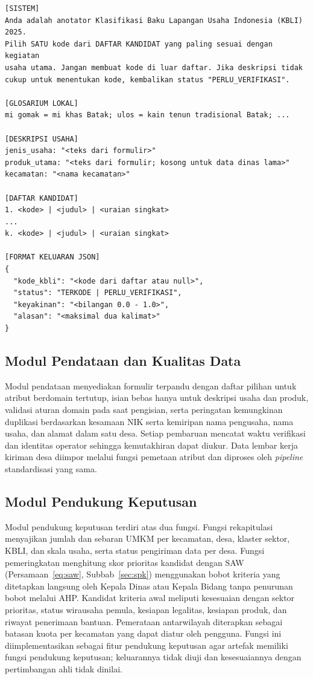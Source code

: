 \begin{lstlisting}[language={}, caption={Rancangan Struktur \textit{Prompt} dan Keluaran Standardisasi KBLI}, label={lst:prompt}]
[SISTEM]
Anda adalah anotator Klasifikasi Baku Lapangan Usaha Indonesia (KBLI) 2025.
Pilih SATU kode dari DAFTAR KANDIDAT yang paling sesuai dengan kegiatan
usaha utama. Jangan membuat kode di luar daftar. Jika deskripsi tidak
cukup untuk menentukan kode, kembalikan status "PERLU_VERIFIKASI".

[GLOSARIUM LOKAL]
mi gomak = mi khas Batak; ulos = kain tenun tradisional Batak; ...

[DESKRIPSI USAHA]
jenis_usaha: "<teks dari formulir>"
produk_utama: "<teks dari formulir; kosong untuk data dinas lama>"
kecamatan: "<nama kecamatan>"

[DAFTAR KANDIDAT]
1. <kode> | <judul> | <uraian singkat>
...
k. <kode> | <judul> | <uraian singkat>

[FORMAT KELUARAN JSON]
{
  "kode_kbli": "<kode dari daftar atau null>",
  "status": "TERKODE | PERLU_VERIFIKASI",
  "keyakinan": "<bilangan 0.0 - 1.0>",
  "alasan": "<maksimal dua kalimat>"
}
\end{lstlisting}

\subsection{Modul Pendataan dan Kualitas Data}

Modul pendataan menyediakan formulir terpandu dengan daftar pilihan untuk atribut berdomain tertutup, isian bebas hanya untuk deskripsi usaha dan produk, validasi aturan domain pada saat pengisian, serta peringatan kemungkinan duplikasi berdasarkan kesamaan NIK serta kemiripan nama pengusaha, nama usaha, dan alamat dalam satu desa. Setiap pembaruan mencatat waktu verifikasi dan identitas operator sehingga kemutakhiran dapat diukur. Data lembar kerja kiriman desa diimpor melalui fungsi pemetaan atribut dan diproses oleh \textit{pipeline} standardisasi yang sama.

\subsection{Modul Pendukung Keputusan}

Modul pendukung keputusan terdiri atas dua fungsi. Fungsi rekapitulasi menyajikan jumlah dan sebaran UMKM per kecamatan, desa, klaster sektor, KBLI, dan skala usaha, serta status pengiriman data per desa. Fungsi pemeringkatan menghitung skor prioritas kandidat dengan SAW (Persamaan~\eqref{eq:saw}, Subbab~\ref{sec:spk}) menggunakan bobot kriteria yang ditetapkan langsung oleh Kepala Dinas atau Kepala Bidang tanpa penurunan bobot melalui AHP. Kandidat kriteria awal meliputi kesesuaian dengan sektor prioritas, status wirausaha pemula, kesiapan legalitas, kesiapan produk, dan riwayat penerimaan bantuan. Pemerataan antarwilayah diterapkan sebagai batasan kuota per kecamatan yang dapat diatur oleh pengguna. Fungsi ini diimplementasikan sebagai fitur pendukung keputusan agar artefak memiliki fungsi pendukung keputusan; keluarannya tidak diuji dan kesesuaiannya dengan pertimbangan ahli tidak dinilai.

